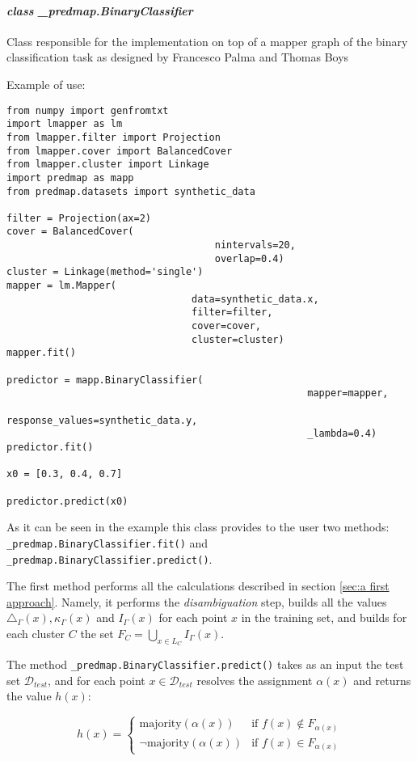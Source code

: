 \paragraph{\textit{class \_predmap.BinaryClassifier}}
Class responsible for the implementation on top of a mapper graph of the binary
classification task as designed by Francesco Palma and Thomas Boys

Example of use:
\begin{lstlisting}[style=mystyle, deletekeywords={filter}]
from numpy import genfromtxt
import lmapper as lm
from lmapper.filter import Projection
from lmapper.cover import BalancedCover
from lmapper.cluster import Linkage
import predmap as mapp
from predmap.datasets import synthetic_data

filter = Projection(ax=2)
cover = BalancedCover(
									nintervals=20,
									overlap=0.4)
cluster = Linkage(method='single')
mapper = lm.Mapper(
								data=synthetic_data.x,
								filter=filter,
								cover=cover,
								cluster=cluster)
mapper.fit()

predictor = mapp.BinaryClassifier(
													mapper=mapper,
													response_values=synthetic_data.y,
													_lambda=0.4)
predictor.fit()

x0 = [0.3, 0.4, 0.7]

predictor.predict(x0)
\end{lstlisting}
As it can be seen in the example this class provides to the user two methods: \lstinline|_predmap.BinaryClassifier.fit()| and \lstinline|_predmap.BinaryClassifier.predict()|. 

The first method performs all the calculations described in section \ref{sec:a first approach}. Namely, it performs the \textit{disambiguation} step, builds all the values $\triangle_\Gamma(x), \kappa_\Gamma(x)$ and $I_\Gamma(x)$ for each point $x$ in the training set, and builds for each cluster $C$ the set $F_C=\bigcup_{x\in L_C} I_\Gamma(x)$. 

The method \lstinline|_predmap.BinaryClassifier.predict()| takes as an input the test set $\mathcal D_{test}$, and for each point $x\in \mathcal D_{test}$ resolves the assignment $\alpha(x)$ and returns the value $h(x)$:

$$h(x) = \begin{cases}
\text{majority}(\alpha(x))& \text{if } f(x)\notin F_{\alpha(x)}\\
\lnot\text{majority}(\alpha(x))& \text{if } f(x)\in F_{\alpha(x)}
\end{cases}$$

